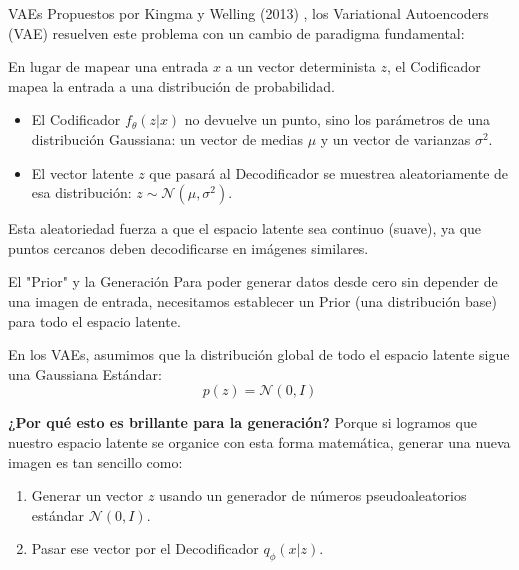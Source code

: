 \begin{frame}{VAEs}
Propuestos por Kingma y Welling (2013) \cite{kingma2013auto}, los \alert{Variational Autoencoders (VAE)} resuelven este problema con un cambio de paradigma fundamental:

En lugar de mapear una entrada $x$ a un vector determinista $z$, el Codificador mapea la entrada a una \alert{distribución de probabilidad}.
\begin{itemize}
    \item El Codificador $f_\theta(z|x)$ no devuelve un punto, sino los parámetros de una distribución Gaussiana: un vector de medias $\mu$ y un vector de varianzas $\sigma^2$.
    \item El vector latente $z$ que pasará al Decodificador se \alert{muestrea} aleatoriamente de esa distribución: $z \sim \mathcal{N}(\mu, \sigma^2)$.
\end{itemize}

Esta aleatoriedad fuerza a que el espacio latente sea \alert{continuo} (suave), ya que puntos cercanos deben decodificarse en imágenes similares.
\end{frame}

\begin{frame}{El "Prior" y la Generación}
Para poder generar datos desde cero sin depender de una imagen de entrada, necesitamos establecer un \alert{Prior} (una distribución base) para todo el espacio latente. 

En los VAEs, asumimos que la distribución global de todo el espacio latente sigue una \alert{Gaussiana Estándar}:
$$ p(z) = \mathcal{N}(0, I) $$

\textbf{¿Por qué esto es brillante para la generación?}
Porque si logramos que nuestro espacio latente se organice con esta forma matemática, generar una nueva imagen es tan sencillo como:
\begin{enumerate}
    \item Generar un vector $z$ usando un generador de números pseudoaleatorios estándar $\mathcal{N}(0, I)$.
    \item Pasar ese vector por el Decodificador $q_\phi(x|z)$.
\end{enumerate}
\end{frame}

